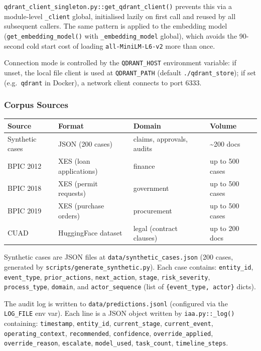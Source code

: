 \documentclass[12pt,a4paper]{article}
\begin{document}
\texttt{qdrant\_client\_singleton.py::get\_qdrant\_client()} prevents this via a
module-level \texttt{\_client} global, initialised lazily on first call and reused
by all subsequent callers. The same pattern is applied to the embedding model
(\texttt{get\_embedding\_model()} with \texttt{\_embedding\_model} global), which
avoids the 90-second cold start cost of loading \texttt{all-MiniLM-L6-v2} more than once.

Connection mode is controlled by the \texttt{QDRANT\_HOST} environment variable:
if unset, the local file client is used at \texttt{QDRANT\_PATH} (default \texttt{./qdrant\_store});
if set (e.g.\ \texttt{qdrant} in Docker), a network client connects to port 6333.

\subsubsection{Corpus Sources}

\begin{center}
\begin{tabular}{@{}llll@{}}
\toprule
\textbf{Source} & \textbf{Format} & \textbf{Domain} & \textbf{Volume} \\
\midrule
Synthetic cases & JSON (200 cases) & claims, approvals, audits & \textasciitilde{}200 docs \\
BPIC 2012 & XES (loan applications) & finance & up to 500 cases \\
BPIC 2018 & XES (permit requests) & government & up to 500 cases \\
BPIC 2019 & XES (purchase orders) & procurement & up to 500 cases \\
CUAD & HuggingFace dataset & legal (contract clauses) & up to 200 docs \\
\bottomrule
\end{tabular}
\end{center}

Synthetic cases are JSON files at \texttt{data/synthetic\_cases.json} (200 cases,
generated by \texttt{scripts/generate\_synthetic.py}). Each case contains:
\texttt{entity\_id}, \texttt{event\_type}, \texttt{prior\_actions}, \texttt{next\_action},
\texttt{stage}, \texttt{risk\_severity}, \texttt{process\_type}, \texttt{domain},
and \texttt{actor\_sequence} (list of \texttt{\{event\_type, actor\}} dicts).

The audit log is written to \texttt{data/predictions.jsonl} (configured via the
\texttt{LOG\_FILE} env var). Each line is a JSON object written by \texttt{iaa.py::\_log()}
containing: \texttt{timestamp}, \texttt{entity\_id}, \texttt{current\_stage},
\texttt{current\_event}, \texttt{operating\_context}, \texttt{recommended},
\texttt{confidence}, \texttt{override\_applied}, \texttt{override\_reason},
\texttt{escalate}, \texttt{model\_used}, \texttt{task\_count}, \texttt{timeline\_steps}.
\end{document}
